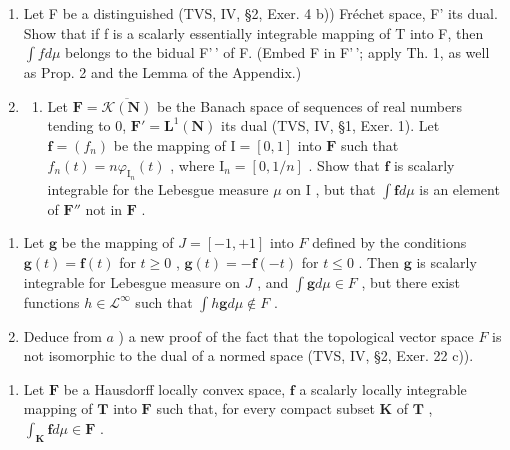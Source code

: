 \begin{enumerate}
\def\labelenumi{\arabic{enumi})}
\setcounter{enumi}{5}
\item
  Let F be a distinguished (TVS, IV, §2, Exer. 4 b)) Fréchet space, F' its dual. Show that if f is a scalarly essentially integrable mapping of T into F, then \(\int f d\mu\) belongs to the bidual F'\,' of F. (Embed F in F'\,'; apply Th. 1, as well as Prop. 2 and the Lemma of the Appendix.)
\item
  \begin{enumerate}
  \def\labelenumii{\alph{enumii})}
  \tightlist
  \item
    Let \(\mathbf{F} = \overline{\mathcal{K}(\mathbf{N})}\) be the Banach space of sequences of real numbers tending to 0, \(\mathbf{F}' = \mathbf{L}^1 (\mathbf{N})\) its dual (TVS, IV, §1, Exer. 1). Let \(\mathbf{f} = (f_n)\) be the mapping of \(\mathrm{I} = [0,1]\) into \(\mathbf{F}\) such that \(f_{n}(t) = n\varphi_{\mathrm{I}_{n}}(t)\) , where \(\mathrm{I}_n = [0,1 / n]\) . Show that \(\mathbf{f}\) is scalarly integrable for the Lebesgue measure \(\mu\) on \(\mathrm{I}\) , but that \(\int \mathbf{f}d\mu\) is an element of \(\mathbf{F}''\) not in \(\mathbf{F}\) .
  \end{enumerate}
\end{enumerate}

\begin{enumerate}
\def\labelenumi{\alph{enumi})}
\setcounter{enumi}{1}
\item
  Let \(\mathbf{g}\) be the mapping of \(J = [-1, +1]\) into \(F\) defined by the conditions \(\mathbf{g}(t) = \mathbf{f}(t)\) for \(t \geqslant 0\) , \(\mathbf{g}(t) = -\mathbf{f}(-t)\) for \(t \leqslant 0\) . Then \(\mathbf{g}\) is scalarly integrable for Lebesgue measure on \(J\) , and \(\int \mathbf{g} d\mu \in F\) , but there exist functions \(h \in \mathcal{L}^{\infty}\) such that \(\int h\mathbf{g} d\mu \notin F\) .
\item
  Deduce from \(a\) ) a new proof of the fact that the topological vector space \(F\) is not isomorphic to the dual of a normed space (TVS, IV, §2, Exer. 22 c)).
\end{enumerate}

\begin{enumerate}
\def\labelenumi{\arabic{enumi})}
\setcounter{enumi}{7}
\tightlist
\item
  Let \(\mathbf{F}\) be a Hausdorff locally convex space, \(\mathbf{f}\) a scalarly locally integrable mapping of \(\mathbf{T}\) into \(\mathbf{F}\) such that, for every compact subset \(\mathbf{K}\) of \(\mathbf{T}\) , \(\int_{\mathbf{K}} \mathbf{f} d\mu \in \mathbf{F}\) .
\end{enumerate}

